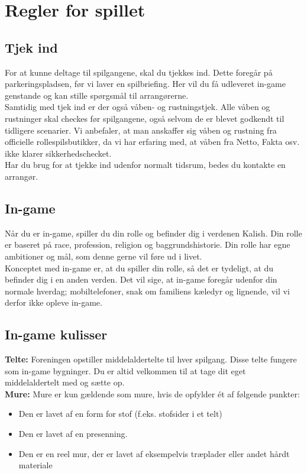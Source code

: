 \chapter*{Regler for spillet}
\section*{Tjek ind}

For at kunne deltage til spilgangene, skal du tjekkes ind. Dette foregår på parkeringspladsen, før vi laver en spilbriefing. Her vil du få udleveret in-game genstande og kan stille spørgsmål til arrangørerne.\\
Samtidig med tjek ind er der også våben- og rustningstjek. Alle våben og rustninger skal checkes før spilgangene, også selvom de er blevet godkendt til tidligere scenarier. Vi anbefaler, at man anskaffer sig
våben og rustning fra officielle rollespilsbutikker, da vi har erfaring med, at våben fra Netto, Fakta osv. ikke klarer sikkerhedschecket.\\
Har du brug for at tjekke ind udenfor normalt tidsrum, bedes du kontakte en arrangør.

\section*{In-game}
Når du er in-game, spiller du din rolle og befinder dig i verdenen Kalish. Din rolle er baseret på race, profession, religion og baggrundshistorie. Din rolle har egne ambitioner og mål, som denne gerne vil føre ud i livet.\\
Konceptet med in-game er, at du spiller din rolle, så det er tydeligt, at du befinder dig i en anden verden. Det vil sige, at in-game foregår udenfor din normale hverdag; mobiltelefoner, snak om familiens kæledyr og lignende, vil vi derfor ikke opleve in-game.

\section*{In-game kulisser}
\textbf{Telte:} Foreningen opstiller middelaldertelte til hver spilgang. Disse telte fungere som in-game bygninger. Du er altid velkommen til at tage dit eget middelaldertelt med og sætte op.\\
\textbf{Mure:} Mure er kun gældende som mure, hvis de opfylder ét af følgende punkter:
\begin{itemize}
    \item Den er lavet af en form for stof (f.eks. stofsider i et telt)
    \item Den er lavet af en presenning.
    \item Den er en reel mur, der er lavet af eksempelvis træplader eller andet hårdt materiale
\end{itemize}

